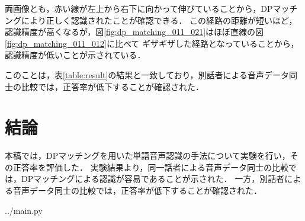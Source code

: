 \documentclass[dvipdfmx,titlepage,a4j]{jsarticle}
\begin{document}
両画像とも，赤い線が左上から右下に向かって伸びていることから，DPマッチングにより正しく認識されたことが確認できる．
この経路の距離が短いほど，認識精度が高くなるが，図\ref{fig:dp_matching_011_021}はほぼ直線の図\ref{fig:dp_matching_011_012}に比べて
ギザギザした経路となっていることから，認識精度が低いことが示されている．

このことは，表\ref{table:result}の結果と一致しており，別話者による音声データ同士の比較では，正答率が低下することが確認された．


\section{結論}
本稿では，DPマッチングを用いた単語音声認識の手法について実験を行い，その正答率を評価した．
実験結果より，同一話者による音声データ同士の比較では，DPマッチングによる認識が容易であることが示された．
一方，別話者による音声データ同士の比較では，正答率が低下することが確認された．

\newpage


{../main.py}

\nocite{*}


\end{document}
